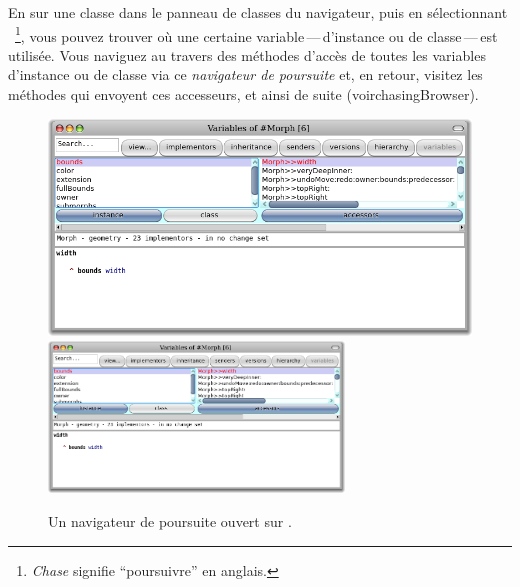\documentclass[a4paper,10pt,twoside]{book}
\begin{document}
\subsubsection{}

En \actclickant sur une classe dans le panneau de classes du
navigateur, puis en sélectionnant
~\footnote{\emph{Chase} signifie
  ``poursuivre'' en anglais.}, vous pouvez trouver 
où une certaine variable\,---\,d'instance ou de classe\,---\,est
utilisée.
Vous naviguez au travers des méthodes d'accès de toutes les variables
d'instance ou de classe via ce \emph{navigateur de poursuite} et, en
retour, visitez les méthodes qui envoyent ces accesseurs, et
ainsi de suite (voir{chasingBrowser}).

\begin{figure}[btp]
	\begin{center}
	\ifluluelse
		{\includegraphics[width=\textwidth]{chasingBrowser}}
		{\includegraphics[width=0.7\textwidth]{chasingBrowser}}
	\end{center}
	\caption{Un navigateur de poursuite ouvert sur .}
\end{figure}

\end{document}
